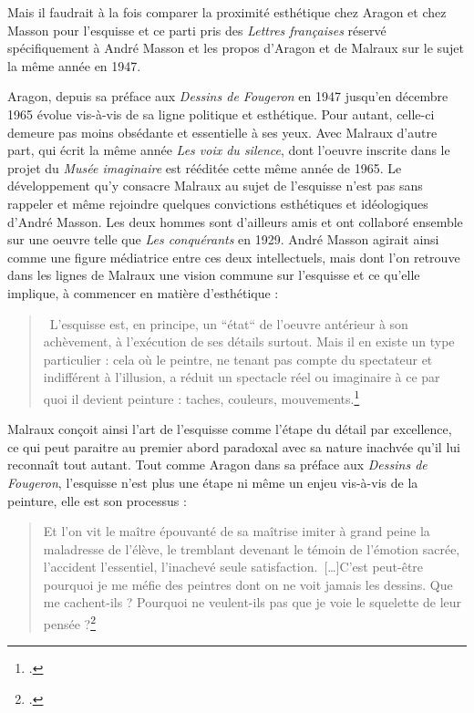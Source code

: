 Mais il faudrait à la fois comparer la proximité esthétique chez Aragon et chez Masson pour l'esquisse et ce parti pris des \emph{Lettres françaises} réservé spécifiquement à André Masson et les propos d'Aragon et de Malraux sur le sujet la même année en 1947.

Aragon, depuis sa préface aux \emph{Dessins de Fougeron} en 1947 jusqu'en décembre 1965 évolue vis-à-vis de sa ligne politique et esthétique. Pour autant, celle-ci demeure pas moins obsédante et essentielle à ses yeux. Avec Malraux d'autre part, qui écrit la même année \emph{Les voix du silence}, dont l'oeuvre inscrite dans le projet du \emph{Musée imaginaire} est rééditée cette même année de 1965. Le développement qu'y consacre Malraux au sujet de l'esquisse n'est pas sans rappeler et même rejoindre quelques convictions esthétiques et idéologiques d'André Masson. Les deux hommes sont d'ailleurs amis et ont collaboré ensemble sur une oeuvre telle que \emph{Les conquérants} en 1929. André Masson agirait ainsi comme une figure médiatrice entre ces deux intellectuels, mais dont l'on retrouve dans les lignes de Malraux une vision commune sur l'esquisse et ce qu'elle implique, à commencer en matière d'esthétique : 

\begin{quote}
 L’esquisse est, en principe, un “état“ de l’oeuvre antérieur à son achèvement, à l’exécution de ses détails surtout. Mais il en existe un type particulier : cela où le peintre, ne tenant pas compte du spectateur et indifférent à l’illusion, a réduit un spectacle réel ou imaginaire à ce par quoi il devient peinture : taches, couleurs, mouvements.\footcite[p52]{museeimaginaire}\end{quote} 

Malraux conçoit ainsi l'art de l'esquisse comme l'étape du détail par excellence, ce qui peut paraitre au premier abord paradoxal avec sa nature inachvée qu'il lui reconnaît tout autant. Tout comme Aragon dans sa préface aux \emph{Dessins de Fougeron}, l'esquisse n'est plus une étape ni même un enjeu vis-à-vis de la peinture, elle est son processus :

\begin{quote}
Et l’on vit le maître épouvanté de sa maîtrise imiter à grand peine la maladresse de l’élève, le tremblant devenant le témoin de l’émotion sacrée, l’accident l’essentiel, l’inachevé seule satisfaction. […]C’est peut-être pourquoi je me méfie des peintres dont on ne voit jamais les dessins. Que me cachent-ils ? Pourquoi ne veulent-ils pas que je voie le squelette de leur pensée ?\footcite[p133]{ecritssurla}\end{quote} 

